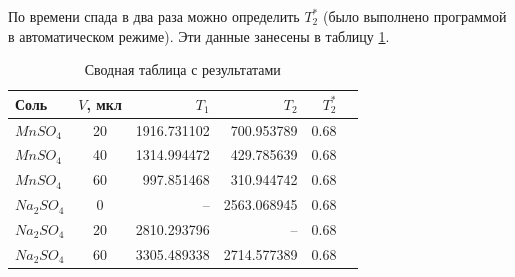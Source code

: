 По времени спада в два раза можно определить $ T_2^* $ (было выполнено программой в автоматическом режиме). Эти данные занесены в таблицу \ref{table:all-T}.



\begin{table}[ht]
	\caption{Сводная таблица с результатами}
	\label{table:all-T}
	\centering
	\begin{tabular}{|l|c|r|r|r|r|}
		\toprule
		Соль &     $V$, мкл &          $T_1$ &          $T_2$ &  $T_2^*$ \\
		\midrule
		$MnSO_4$  	&  20 &  1916.731102 &   700.953789 &  0.68 \\
		$MnSO_4$  	&  40 &  1314.994472 &   429.785639 &  0.68 \\
		$MnSO_4$ 	&  60 &   997.851468 &   310.944742 &  0.68 \\
		$Na_2 SO_4$ &   0 &          --	 &  2563.068945 &  0.68 \\
		$Na_2 SO_4$ &  20 &  2810.293796 &          --  &  0.68 \\
		$Na_2 SO_4$ &  60 &  3305.489338 &  2714.577389 &  0.68 \\
		\bottomrule
	\end{tabular}
\end{table}
